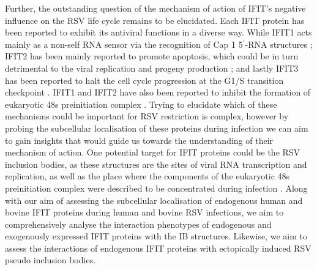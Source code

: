 Further, the outstanding question of the mechanism of action of IFIT's negative influence on the RSV life cycle remains to be elucidated. Each IFIT protein has been reported to exhibit its antiviral functions in a diverse way. While IFIT1 acts mainly as a non-self RNA sensor via the recognition of Cap 1 5$^{\prime}$-RNA structures \cite{Mears2018BetterResponse}; IFIT2 has been mainly reported to promote apoptosis, which could be in turn detrimental to the viral replication and progeny production \cite{Chen2017InhibitionApoptosis}; and lastly IFIT3 has been reported to halt the cell cycle progression at the G1/S transition checkpoint \cite{Xiao2006RIG-GProteins}. IFIT1 and IFIT2 have also been reported to inhibit the formation of eukaryotic 48s preinitiation complex \cite{Diamond2014IFIT1:Translation, Guo2000CharacterizationVirus}. Trying to elucidate which of these mechanisms could be important for RSV restriction is complex, however by probing the subcellular localisation of these proteins during infection we can aim to gain insights that would guide us towards the understanding of their mechanism of action. One potential target for IFIT proteins could be the RSV inclusion bodies, as these structures are the sites of viral RNA transcription and replication, as well as the place where the components of the eukaryotic 48s preinitiation complex were described to be concentrated during infection \cite{Rincheval2017FunctionalVirus, Jobe2020RespiratorySignaling, Jobe2023ViralCondensates}. Along with our aim of assessing the subcellular localisation of endogenous human and bovine IFIT proteins during human and bovine RSV infections, we aim to comprehensively analyse the interaction phenotypes of endogenous and exogenously expressed IFIT proteins with the IB structures. Likewise, we aim to assess the interactions of endogenous IFIT proteins with ectopically induced RSV pseudo inclusion bodies.


